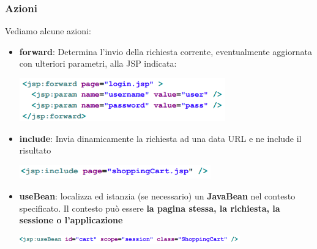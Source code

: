 \documentclass[12pt]{article}
\begin{document}
\subsubsection{Azioni}
Vediamo alcune azioni:
\begin{itemize}
    \item \textbf{forward}: Determina l'invio della richiesta corrente, eventualmente aggiornata con ulteriori parametri, alla JSP indicata:
    \begin{center}
        \includegraphics[width = 0.70\textwidth]{Images/196.png}
    \end{center}
    \item \textbf{include}: Invia dinamicamente la richiesta ad una data URL e ne include il risultato
    \begin{center}
        \includegraphics[width = 0.65\textwidth]{Images/197.png}
    \end{center}
    \item \textbf{useBean}: localizza ed istanzia (se necessario) un \textbf{JavaBean} nel contesto specificato. Il contesto può essere \textbf{la pagina stessa, la richiesta, la sessione o l'applicazione}
    \begin{center}
        \includegraphics[width = 0.75\textwidth]{Images/198.png}
    \end{center}
\end{itemize}
\end{document}
